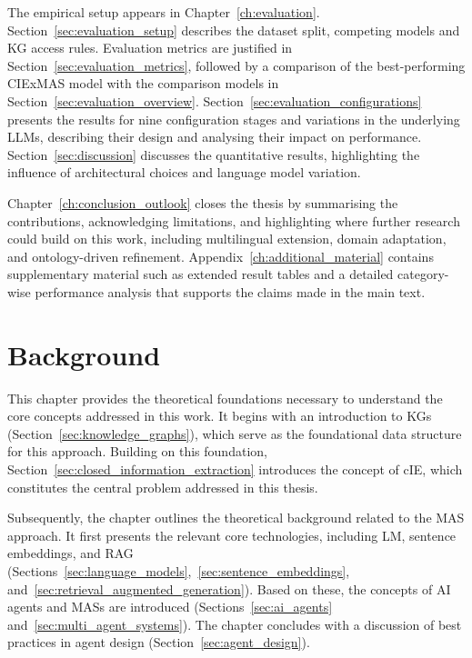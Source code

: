 \documentclass[a4paper,oneside,bibliography=totoc]{scrbook}
\begin{document}
The empirical setup appears in Chapter~\ref{ch:evaluation}. Section~\ref{sec:evaluation_setup} describes the dataset split, competing models and \ac{KG} access rules. Evaluation metrics are justified in Section~\ref{sec:evaluation_metrics}, followed by a comparison of the best-performing CIExMAS model with the comparison models in Section~\ref{sec:evaluation_overview}. Section~\ref{sec:evaluation_configurations} presents the results for nine configuration stages and variations in the underlying \acp{LLM}, describing their design and analysing their impact on performance. Section~\ref{sec:discussion} discusses the quantitative results, highlighting the influence of architectural choices and language model variation.

Chapter~\ref{ch:conclusion_outlook} closes the thesis by summarising the contributions, acknowledging limitations, and highlighting where further research could build on this work, including multilingual extension, domain adaptation, and ontology-driven refinement. Appendix~\ref{ch:additional_material} contains supplementary material such as extended result tables and a detailed category-wise performance analysis that supports the claims made in the main text.

\chapter{Background}
\label{ch:background}

\makeatletter
{}
\makeatother

This chapter provides the theoretical foundations necessary to understand the core concepts addressed in this work. It begins with an introduction to \acp{KG} (Section~\ref{sec:knowledge_graphs}), which serve as the foundational data structure for this approach. Building on this foundation, Section~\ref{sec:closed_information_extraction} introduces the concept of \ac{cIE}, which constitutes the central problem addressed in this thesis.

Subsequently, the chapter outlines the theoretical background related to the \ac{MAS} approach. It first presents the relevant core technologies, including \ac{LM}, sentence embeddings, and \ac{RAG} (Sections~\ref{sec:language_models},~\ref{sec:sentence_embeddings}, and~\ref{sec:retrieval_augmented_generation}). Based on these, the concepts of \ac{AI} agents and \acp{MAS} are introduced (Sections~\ref{sec:ai_agents} and~\ref{sec:multi_agent_systems}). The chapter concludes with a discussion of best practices in agent design (Section~\ref{sec:agent_design}).
\end{document}
